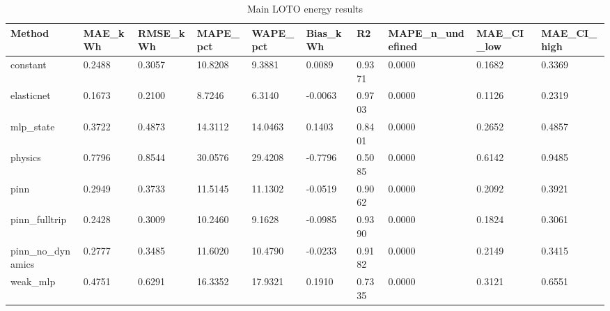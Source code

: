\begin{table}[t]
\centering
\caption{Main LOTO energy results}
\label{tab:main}
\begin{tabular}{llllllllll}
\hline
Method & MAE\_kWh & RMSE\_kWh & MAPE\_pct & WAPE\_pct & Bias\_kWh & R2 & MAPE\_n\_undefined & MAE\_CI\_low & MAE\_CI\_high \\
\hline
constant & 0.2488 & 0.3057 & 10.8208 & 9.3881 & 0.0089 & 0.9371 & 0.0000 & 0.1682 & 0.3369 \\
elasticnet & 0.1673 & 0.2100 & 8.7246 & 6.3140 & -0.0063 & 0.9703 & 0.0000 & 0.1126 & 0.2319 \\
mlp\_state & 0.3722 & 0.4873 & 14.3112 & 14.0463 & 0.1403 & 0.8401 & 0.0000 & 0.2652 & 0.4857 \\
physics & 0.7796 & 0.8544 & 30.0576 & 29.4208 & -0.7796 & 0.5085 & 0.0000 & 0.6142 & 0.9485 \\
pinn & 0.2949 & 0.3733 & 11.5145 & 11.1302 & -0.0519 & 0.9062 & 0.0000 & 0.2092 & 0.3921 \\
pinn\_fulltrip & 0.2428 & 0.3009 & 10.2460 & 9.1628 & -0.0985 & 0.9390 & 0.0000 & 0.1824 & 0.3061 \\
pinn\_no\_dynamics & 0.2777 & 0.3485 & 11.6020 & 10.4790 & -0.0233 & 0.9182 & 0.0000 & 0.2149 & 0.3415 \\
weak\_mlp & 0.4751 & 0.6291 & 16.3352 & 17.9321 & 0.1910 & 0.7335 & 0.0000 & 0.3121 & 0.6551 \\
\hline
\end{tabular}
\end{table}
